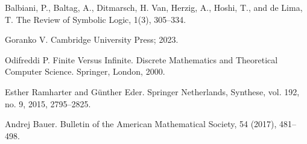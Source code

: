 \documentclass[openany]{book}
\theoremstyle{plain}
\theoremstyle{definition}
\begin{document}
\begin{thebibliography}{2}
    Balbiani, P., Baltag, A., Ditmarsch, H. Van, Herzig, A., Hoshi, T., and de Lima, T.
    \newblock The Review of Symbolic Logic, 1(3), 305--334.

    Goranko V.
    \newblock Cambridge University Press; 2023.

    Odifreddi P.
    \newblock Finite Versus Infinite. Discrete Mathematics and Theoretical Computer Science. Springer, London, 2000.

    Esther Ramharter and G\"{u}nther Eder.
    \newblock Springer Netherlands, Synthese, vol. 192, no. 9, 2015, 2795--2825.

    Andrej Bauer.
    \newblock Bulletin of the American Mathematical Society, 54 (2017), 481--498. 

\end{thebibliography}
\end{document}
